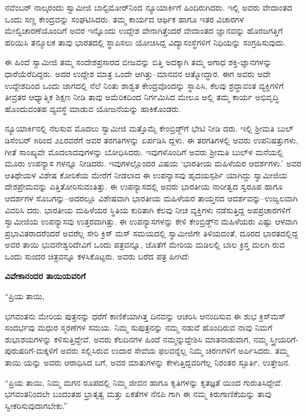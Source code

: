 ನವೆಂಬರ್ ನಾಲ್ಕರಂದು ಸ್ವಾಮೀಜಿ ಬಾಲ್ಟಿಮೋರ್​ನಿಂದ ನ್ಯೂಯಾರ್ಕಿಗೆ ಹಿಂದಿರುಗಿದರು. ಇಲ್ಲಿ ಅವರು ವೇದಾಂತದ ಒಂದು ಸಣ್ಣ ಕೇಂದ್ರವನ್ನು ಸಂಘಟಿಸಿದರು. ತಮ್ಮ ಕಾರ್ಯದ ಆರ್ಥಿಕ ಹಾಗೂ ಇತರ ವಿಚಾರಗಳ ಮೇಲ್ವಿಚಾರಣೆಯೊಂದಿಗೆ ಅವರ ಇನ್ನೊಂದು ಉದ್ದೇಶ ವೇನಾಗಿತ್ತೆಂದರೆ ವೇದಾಂತದ ಜ್ಞಾನವನ್ನು ಹೊರಜಗತ್ತಿಗೆ ಹರಿಯಿಸಿ ತನ್ಮೂಲಕ ತಾವು ಭಾರತದಲ್ಲಿ ಸ್ಥಾಪಿಸಲು ಯೋಚಿಸಿದ್ದ ವಿದ್ಯಾಸಂಸ್ಥೆಗಳಿಗೆ ನಿಧಿಯನ್ನು ಸಂಗ್ರಹಿಸುವುದು.

ಈ ಹಿಂದೆ ಸ್ವಾಮೀಜಿ ತಮ್ಮ ಸಂದೇಶಪ್ರಸಾರದ ಬೀಜವನ್ನು ಬಿತ್ತಿ ಅದಕ್ಕಾಗಿ ತಮ್ಮ ಅಗಾಧ ಶಕ್ತಿ-ಜ್ಞಾನಗಳನ್ನು ಧಾರೆಯೆರೆದಿದ್ದರು. ಅದರ ಉದ್ದೇಶ ಮಾತ್ರ ಒಂದೇ ಆಗಿತ್ತು–ಮಾನವನ ಆತ್ಮೋದ್ಧಾರ. ಈಗ ಅವರು ಅದೇ ಉದ್ದೇಶದಿಂದ ಒಂದು ಜಾಗದಲ್ಲಿ ನೆಲೆ ನಿಂತು ಶಾಶ್ವತ ಕೇಂದ್ರವೊಂದನ್ನು ಸ್ಥಾಪಿಸಿ, ಕೆಲವು ಶ್ರದ್ಧಾವಂತ ವ್ಯಕ್ತಿಗಳಿಗೆ ತೀವ್ರತರ ಆಧ್ಯಾತ್ಮಿಕ ಶಿಕ್ಷಣ ನೀಡಿ ತಾವು ಅಮೆರಿಕದಿಂದ ನಿರ್ಗಮಿಸಿದ ಮೇಲೂ ಅಲ್ಲಿ ತಮ್ಮ ಕಾರ್ಯ ಅಭಿವೃದ್ಧಿ ಹೊಂದುವಂತಹ ವ್ಯವಸ್ಥೆ ಮಾಡುವ ಯೋಜನೆಯನ್ನು ಹಾಕಿಕೊಂಡರು.

ನ್ಯೂಯಾರ್ಕಿನಲ್ಲಿ ನೆಲಸುವ ಮೊದಲು ಸ್ವಾಮೀಜಿ ಮತ್ತೊಮ್ಮೆ ಕೇಂಬ್ರಿಡ್ಜ್​ಗೆ ಭೇಟಿ ನೀಡಿ ದರು. ಇಲ್ಲಿ ಶ್ರೀಮತಿ ಬುಲ್ ಡಿಸೆಂಬರ್ ೫ರಿಂದ ೨೭ರವರೆಗೆ ಅವರ ತರಗತಿಗಳನ್ನು ಏರ್ಪಡಿಸಿ ದ್ದಳು. ಈ ತರಗತಿಗಳಲ್ಲಿ ಅವರು ಉಪನಿಷತ್ತುಗಳು, ಗೀತೆ ಸಾಂಖ್ಯವೇ ಮೊದಲಾದವುಗಳನ್ನು ಬೋಧಿಸಿದರು. ಇವುಗಳೊಂದಿಗೆ ಅವರು ಶ್ರೀಮತಿ ಬುಲ್​ಳ ಮನೆಯಲ್ಲಿ ಮೂರು ಉಪನ್ಯಾಸ ಗಳನ್ನೂ ನೀಡಿದರು. ಇವುಗಳಲ್ಲೊಂದರ ವಿಷಯ ‘ಭಾರತೀಯ ಮಹಿಳೆಯರ ಆದರ್ಶಗಳು.’ ಅವರ ಆತಿಥೇಯಳ ವಿಶೇಷ ಕೋರಿಕೆಯ ಮೇರೆಗೆ ನೀಡಲಾದ ಈ ಉಪನ್ಯಾಸವು ಹೃದಯಸ್ಪರ್ಶಿ ಯಾಗಿದ್ದು ಸ್ವಾಮೀಜಿಯ ದೇಶಪ್ರೇಮವನ್ನು ಎತ್ತಿತೋರಿಸುವಂತಿತ್ತು. ಈ ಉಪನ್ಯಾಸದಲ್ಲಿ ಅವರು ಭಾರತೀಯ ನಾರೀತ್ವದ ಸ್ವರೂಪ ಹಾಗೂ ಆದರ್ಶಗಳ ಸೊಬಗನ್ನು–ಅದರಲ್ಲೂ ವಿಶೇಷವಾಗಿ ಭಾರತೀಯ ಮಹಿಳೆಯರ ತಾಯ್ತನದ ಆದರ್ಶವನ್ನು–ಉಜ್ವಲವಾಗಿ ವಿವರಿಸಿ ದರು. ಭಾರತೀಯ ಮಹಿಳೆಯರ ಸ್ಥಿತಿಯ ಕುರಿತಾಗಿ ಕೆಲವು ನೀಚ ವ್ಯಕ್ತಿಗಳು ನಡೆಸುತ್ತಿದ್ದ ಅಪಪ್ರಚಾರಗಳಿಗೆ ಸ್ವಾಮೀಜಿಯ ಉಪನ್ಯಾಸವು ಉತ್ತರವಾಗಿತ್ತು. ಈ ಉಪನ್ಯಾಸಗಳನ್ನು ಕೇಳಿ ಕೇಂಬ್ರಿಡ್ಜ್​ನ ಮಹಿಳೆಯರು ಎಷ್ಟು ಆಳವಾಗಿ ಪ್ರಭಾವಿತರಾದರೆಂದರೆ ಅವರೆಲ್ಲ ಸೇರಿ ಕ್ರಿಸ್ ಮಸ್ ಸಮಯದಲ್ಲಿ ಸ್ವಾಮೀಜಿಗೇ ತಿಳಿಯದಂತೆ, ದೂರದ ಭಾರತದಲ್ಲಿದ್ದ ಅವರ ತಾಯಿ ಭುವನೇಶ್ವರಿದೇವಿಗೆ ಒಂದು ಪತ್ರವನ್ನೂ, ಜೊತೆಗೆ ಮೇರಿಯ ಮಡಿಲಲ್ಲಿ ಬಾಲ ಕ್ರಿಸ್ತ ಮಲಗಿ ರುವ ಒಂದು ಸುಂದರ ಚಿತ್ರವನ್ನೂ ಕಳಸಿಕೊಟ್ಟರು. ಅವರು ಬರೆದ ಪತ್ರ ಹೀಗಿದೆ:

\textbf{ವಿವೇಕಾನಂದರ ತಾಯಿಯವರಿಗೆ}

\noindent

“ಪ್ರಿಯ ತಾಯಿ,

ಭಗವಂತನು ಮೇರಿಯ ಪುತ್ರನನ್ನು ಧರೆಗೆ ಕಾಣಿಕೆಯಾಗಿತ್ತ ದಿನವನ್ನು ಆಚರಿಸಿ ಆನಂದಿಸುವ ಈ ಶುಭ ಕ್ರಿಸ್​ಮಸ್ ಸಂದರ್ಭವು ಮಧುರ ಸ್ಮರಣೆಗಳ ಸಮಯ. ನಿಮ್ಮ ಸುಪುತ್ರನನ್ನು ನಮ್ಮ ನಡುವೆ ಹೊಂದಿರುವ ನಾವು ನಿಮಗೆ ಶುಭಾಶಯಗಳನ್ನು ಕಳಿಸುತ್ತಿದ್ದೇವೆ. ಅವರು ಕೆಲದಿನಗಳ ಹಿಂದೆ ನಮ್ಮನ್ನುದ್ದೇಶಿಸಿ ಮಾತನಾಡುವಾಗ, ನಮ್ಮ ಸ್ತ್ರೀಯರಿಗೆ-ಪುರುಷರಿಗೆ-ಮಕ್ಕಳಿಗೆ ಅವರು ಸಲ್ಲಿಸಿರುವ ಉದಾರ ಸೇವೆಯ ಫಲವನ್ನೆಲ್ಲ ನಿಮ್ಮ ಚರಣಗಳಿಗೆ ಅರ್ಪಿಸಿದರು. ತಮ್ಮ ತಾಯಿ ಯನ್ನು ಅವರು ಆರಾಧಿಸಿದ ಬಗೆ, ಅವರ ಮಾತುಗಳನ್ನು ಕೇಳುತ್ತಿದ್ದವರಿಗೆಲ್ಲ ನಿರಂತರ ಸ್ಫೂರ್ತಿ, ಉತ್ತೇಜನ.

“ಪ್ರಿಯ ತಾಯಿ, ನಿಮ್ಮ ಮಗನ ರೂಪದಲ್ಲಿ ನಿಮ್ಮ ಜೀವನ ಹಾಗೂ ಕೃತಿಗಳನ್ನು ಕೃತಜ್ಞತೆ ಯಿಂದ ಗುರುತಿಸಿದ್ದೇವೆ. ಭಗವಂತನಿಂದಲೇ ಬಂದಂತಹ ಭ್ರಾತೃತ್ವ ಮತ್ತು ಏಕತೆಗಳ ನೆನಪಿ ಗಾಗಿ ಈ ನಮ್ಮ ಕಿರುಗಾಣಿಕೆಯನ್ನು ತಾವು ಸ್ವೀಕರಿಸುವುದಾಗಬೇಕು.”

